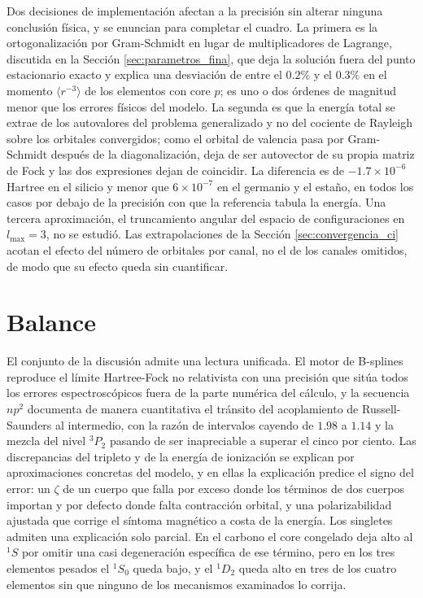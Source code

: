 Dos decisiones de implementación afectan a la precisión sin alterar ninguna conclusión física, y se enuncian para completar el cuadro. La primera es la ortogonalización por Gram-Schmidt en lugar de multiplicadores de Lagrange, discutida en la Sección \ref{sec:parametros_fina}, que deja la solución fuera del punto estacionario exacto y explica una desviación de entre el $0.2\%$ y el $0.3\%$ en el momento $\langle r^{-3} \rangle$ de los elementos con core $p$; es uno o dos órdenes de magnitud menor que los errores físicos del modelo. La segunda es que la energía total se extrae de los autovalores del problema generalizado y no del cociente de Rayleigh sobre los orbitales convergidos; como el orbital de valencia pasa por Gram-Schmidt después de la diagonalización, deja de ser autovector de su propia matriz de Fock y las dos expresiones dejan de coincidir. La diferencia es de $-1.7\times10^{-6}$ Hartree en el silicio y menor que $6\times10^{-7}$ en el germanio y el estaño, en todos los casos por debajo de la precisión con que la referencia tabula la energía. Una tercera aproximación, el truncamiento angular del espacio de configuraciones en $l_{\max}=3$, no se estudió. Las extrapolaciones de la Sección \ref{sec:convergencia_ci} acotan el efecto del número de orbitales por canal, no el de los canales omitidos, de modo que su efecto queda sin cuantificar.

\section{Balance}

El conjunto de la discusión admite una lectura unificada. El motor de B-splines reproduce el límite Hartree-Fock no relativista con una precisión que sitúa todos los errores espectroscópicos fuera de la parte numérica del cálculo, y la secuencia $np^2$ documenta de manera cuantitativa el tránsito del acoplamiento de Russell-Saunders al intermedio, con la razón de intervalos cayendo de $1.98$ a $1.14$ y la mezcla del nivel $^3P_2$ pasando de ser inapreciable a superar el cinco por ciento. Las discrepancias del tripleto y de la energía de ionización se explican por aproximaciones concretas del modelo, y en ellas la explicación predice el signo del error: un $\zeta$ de un cuerpo que falla por exceso donde los términos de dos cuerpos importan y por defecto donde falta contracción orbital, y una polarizabilidad ajustada que corrige el síntoma magnético a costa de la energía. Los singletes admiten una explicación solo parcial. En el carbono el core congelado deja alto al $^1S$ por omitir una casi degeneración específica de ese término, pero en los tres elementos pesados el $^1S_0$ queda bajo, y el $^1D_2$ queda alto en tres de los cuatro elementos sin que ninguno de los mecanismos examinados lo corrija.


